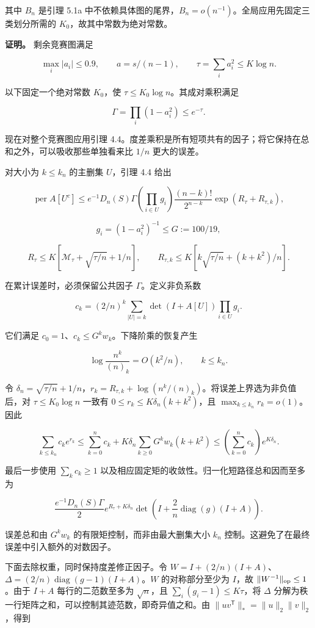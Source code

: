 \documentclass[11pt,a4paper]{article}
\begin{document}
其中 \(B_n\) 是引理 5.1a 中不依赖具体图的尾界，\(B_n=o(n^{-1})\)。全局应用先固定三类划分所需的 \(K_0\)，故其中常数为绝对常数。

\textbf{证明。} 剩余竞赛图满足

\[
\max_i|a_i|\le0.9,\qquad
a=s/(n-1),\qquad \tau=\sum_i a_i^2\le K\log n.
\]

以下固定一个绝对常数 \(K_0\)，使 \(\tau\le K_0\log n\)。其成对乘积满足

\[
\Gamma=\prod_i(1-a_i^2)\le e^{-\tau}.
\]

现在对整个竞赛图应用引理 4.4。度差乘积是所有短项共有的因子；将它保持在总和之外，可以吸收那些单独看来比 \(1/n\) 更大的误差。

对大小为 \(k\le k_n\) 的主删集 \(U\)，引理 4.4 给出

\[
\operatorname{per}A[U^c]\le
e^{-1}D_n(S)\Gamma
\left(\prod_{i\in U}g_i\right)
\frac{(n-k)!}{2^{n-k}}\exp(R_\tau+R_{\tau,k}),
\]

\[
g_i=(1-a_i^2)^{-1}\le G:=100/19,
\]

\[
R_\tau\le K[\mathcal M_\tau+\sqrt{\tau/n}+1/n],\qquad
R_{\tau,k}\le K[k\sqrt{\tau/n}+(k+k^2)/n].
\]

在累计误差时，必须保留公共因子 \(\Gamma\)。定义非负系数

\[
c_k=(2/n)^k\sum_{|U|=k}\det(I+A[U])\prod_{i\in U}g_i.
\]

它们满足 \(c_0=1\)、\(c_k\le G^kw_k\)。下降阶乘的恢复产生

\[
\log\frac{n^k}{(n)_k}=O(k^2/n),\qquad k\le k_n.
\]

令 \(\delta_n=\sqrt{\tau/n}+1/n\)，\(r_k=R_{\tau,k}+\log(n^k/(n)_k)\)。将误差上界选为非负值后，对 \(\tau\le K_0\log n\) 一致有 \(0\le r_k\le K\delta_n(k+k^2)\)，且 \(\max_{k\le k_n}r_k=o(1)\)。因此

\[
\sum_{k\le k_n}c_ke^{r_k}
\le\sum_{k=0}^{n}c_k+
K\delta_n\sum_{k\ge0}G^kw_k(k+k^2)
\le\left(\sum_{k=0}^{n}c_k\right)e^{K\delta_n}.
\]

最后一步使用 \(\sum_kc_k\ge1\) 以及相应固定矩的收敛性。归一化短路径总和因而至多为

\[
\frac{e^{-1}D_n(S)\Gamma}{2}
e^{R_\tau+K\delta_n}
\det\left(I+\frac2n\operatorname{diag}(g)(I+A)\right).
\]

误差总和由 \(G^kw_k\) 的有限矩控制，而非由最大删集大小 \(k_n\) 控制。这避免了在最终误差中引入额外的对数因子。

下面去除权重，同时保持度差修正因子。令 \(W=I+(2/n)(I+A)\)、\(\Delta=(2/n)\operatorname{diag}(g-1)(I+A)\)。\(W\) 的对称部分至少为 \(I\)，故 \(\|W^{-1}\|_{\rm op}\le1\)。由于 \(I+A\) 每行的二范数至多为 \(\sqrt n\)，且 \(\sum_i(g_i-1)\le K\tau\)，将 \(\Delta\) 分解为秩一行矩阵之和，可以控制其迹范数，即奇异值之和。由 \(\|uv^{\mathsf T}\|_*=\|u\|_2\|v\|_2\)，得到
\end{document}
